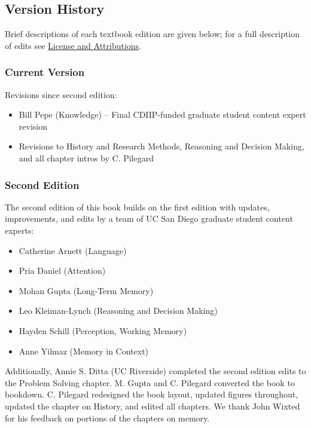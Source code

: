 \documentclass[
]{krantz}
\providecommand{\tightlist}{%
  \setlength{\itemsep}{0pt}\setlength{\parskip}{0pt}}
\begin{document}
\subsection*{Version History}\label{version-history}


Brief descriptions of each textbook edition are given below; for a full description of edits see \hyperref[license-and-attributions]{License and Attributions}.

\subsubsection*{Current Version}\label{current-version}


Revisions since second edition:

\begin{itemize}
\tightlist
\item
  Bill Pepe (Knowledge) -- Final CDIIP-funded graduate student content expert revision
\item
  Revisions to History and Research Methods, Reasoning and Decision Making, and all chapter intros by C. Pilegard
\end{itemize}

\subsubsection*{Second Edition}\label{second-edition}


The second edition of this book builds on the first edition with updates, improvements, and edits by a team of UC San Diego graduate student content experts:

\begin{itemize}
\tightlist
\item
  Catherine Arnett (Language)
\item
  Pria Daniel (Attention)
\item
  Mohan Gupta (Long-Term Memory)
\item
  Leo Kleiman-Lynch (Reasoning and Decision Making)
\item
  Hayden Schill (Perception, Working Memory)
\item
  Anne Yilmaz (Memory in Context)
\end{itemize}

Additionally, Annie S. Ditta (UC Riverside) completed the second edition edits to the Problem Solving chapter. M. Gupta and C. Pilegard converted the book to bookdown. C. Pilegard redesigned the book layout, updated figures throughout, updated the chapter on History, and edited all chapters. We thank John Wixted for his feedback on portions of the chapters on memory.
\end{document}
